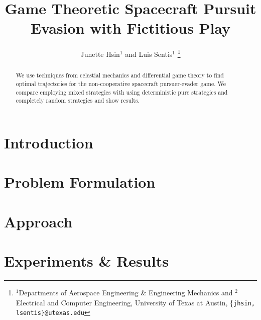 \documentclass[letterpaper, 10 pt, conference]{ieeeconf}  %
\title{\LARGE \bf
Game Theoretic Spacecraft Pursuit Evasion with Fictitious Play
}
\author{
Junette Hsin$^{1}$ and 
Luis Sentis$^{1}$ 
\thanks{$^{1}$Departments of Aerospace Engineering \& Engineering Mechanics and $^{2}$Electrical and Computer Engineering,
        University of Texas at Austin, \{{\tt\small jhsin, lsentis\}@utexas.edu}}%
}
\begin{document}
\maketitle 


\thispagestyle{empty}
\pagestyle{empty}


\begin{abstract}

We use techniques from celestial mechanics and differential game theory to find optimal trajectories for the non-cooperative spacecraft pursuer-evader game. We compare employing mixed strategies with using deterministic pure strategies and completely random strategies and show results. 

\end{abstract}


\section{Introduction}
\label{sec:intro}
 

% 


\section{Problem Formulation}
\label{sec:prob_form}




\section{Approach}
\label{sec:methods}




\section{Experiments \& Results}
\label{sec:results}

\end{document}
